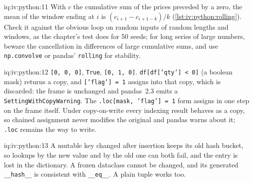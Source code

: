 \begin{solution}{iq:iv:python:11}
With $c$ the cumulative sum of the prices preceded by a zero, the mean of the window ending at $i$ is $(c_{i+1} - c_{i+1-k})/k$
(\cref{lst:iv:python:rolling}). Check it against the obvious loop on random inputs of random lengths and windows, as the chapter's
test does for 50 seeds; for long series of large numbers, beware the cancellation in differences of large cumulative sums, and use
\texttt{np.convolve} or pandas' \texttt{rolling} for stability.
\end{solution}

\begin{solution}{iq:iv:python:12}
\texttt{[0, 0, 0]}, \texttt{True}, \texttt{[0, 1, 0]}. \texttt{df[df['qty'] < 0]} (a boolean mask) returns a copy, and \texttt{['flag'] = 1}
assigns into that copy, which is discarded: the frame is unchanged and pandas~2.3 emits a \texttt{SettingWithCopyWarning}. The
\texttt{.loc[mask, 'flag'] = 1} form assigns in one step on the frame itself. Under copy-on-write every indexing result behaves as a copy,
so chained assignment never modifies the original and pandas warns about it; \texttt{.loc} remains the way to write.
\end{solution}

\begin{solution}{iq:iv:python:13}
\label{lst:iv:python:key}
A mutable key changed after insertion keeps its old hash bucket, so lookups by the new value and by the old one can both fail, and
the entry is lost in the dictionary. A frozen dataclass cannot be changed, and its generated \texttt{\_\_hash\_\_} is consistent with
\texttt{\_\_eq\_\_}. A plain tuple works too.
\end{solution}
